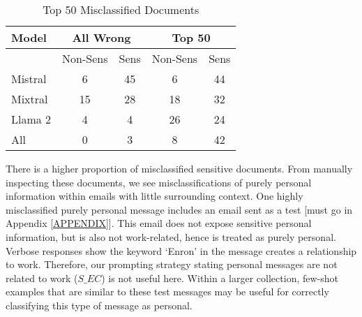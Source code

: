 \begin{table}[]
\centering
\caption{Top 50 Misclassified Documents}
\label{table:misclassified}
\begin{tabular}{@{}lcccc@{}}
\toprule
Model   & \multicolumn{2}{c}{All Wrong} & \multicolumn{2}{c}{Top 50} \\ \midrule
        & Non-Sens   & Sens   & Non-Sens  & Sens \\
Mistral & 6               & 45          & 6              & 44        \\
Mixtral & 15              & 28          & 18             & 32        \\
Llama 2 & 4               & 4           & 26             & 24        \\
All     & 0               & 3           & 8              & 42        \\ \bottomrule
\end{tabular}
\end{table}

There is a higher proportion of misclassified sensitive documents. From manually inspecting these documents, we see misclassifications of purely personal information within emails with little surrounding context. One highly misclassified purely personal message includes an email sent as a test [must go in Appendix \ref{APPENDIX}]. This email does not expose sensitive personal information, but is also not work-related, hence is treated as purely personal. Verbose responses show the keyword ‘Enron’ in the message creates a relationship to work. Therefore, our prompting strategy stating personal messages are not related to work ($S\_EC$) is not useful here. Within a larger collection, few-shot examples that are similar to these test messages may be useful for correctly classifying this type of message as personal. 

